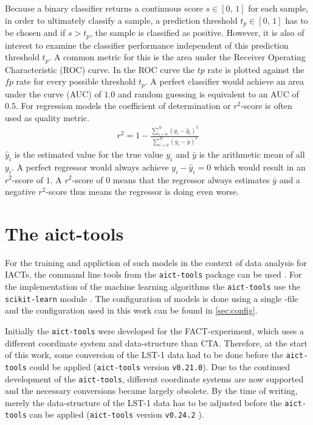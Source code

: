 Because a binary classifier returns a continuous score $s \in [0,\, 1]$ for each sample, in order to ultimately classify a sample,
a prediction threshold $t_p \in [0,\, 1]$ has to be chosen and if $s > t_p$, the sample is classified as positive. 
However, it is also of interest to examine the classifier performance independent of this prediction threshold $t_p$.
A common metric for this is the area under the Receiver Operating Characteristic (ROC) curve.
In the ROC curve the $tp$ rate is plotted against the $fp$ rate for every possible threshold $t_p$.
A perfect classifier would achieve an area under the curve (AUC) of $\num{1.0}$ and random guessing is equivalent to an AUC of $\num{0.5}$.
For regression models the coefficient of determination or $r^2$-score is often used as quality metric.
\begin{align}
    r^2 = 1 - \frac{\sum_{i = 0}^N (y_i - \hat{y}_i)^2}{\sum_{i = 0}^N (y_i - \bar{y})^2}
\end{align}
$\hat{y}_i$ is the estimated value for the true value $y_i$ and $\bar{y}$ is the arithmetic mean of all $y_i$.
A perfect regressor would always achieve $y_i - \hat{y}_i = 0$ which would result in an $r^2$-score of $\num{1}$.
A $r^2$-score of $\num{0}$ means that the regressor always estimates $\bar{y}$ and a negative $r^2$-score thus means the regressor is doing even worse.


\section{The aict-tools}
For the training and appliction of such models in the context of data analysis for IACTs, the command line tools from the \texttt{aict-tools} package can be used \cite{aict-tools}. 
For the implementation of the machine learning algorithms the \texttt{aict-tools} use the \texttt{scikit-learn} module \cite{scikit-learn}.
The configuration of models is done using a single -file and the configuration used in this work can be found in \autoref{sec:config}.

Initially the \texttt{aict-tools} were developed for the FACT-experiment, which uses a different coordinate system and data-structure than CTA.
Therefore, at the start of this work, some conversion of the LST-1 data had to be done before the \texttt{aict-tools} could be applied 
(\texttt{aict-tools} version \texttt{v0.21.0}).
Due to the continued development of the \texttt{aict-tools}, different coordinate systems are now supported and the necessary conversions became largely obsolete.
By the time of writing, merely the data-structure of the LST-1 data has to be adjusted before the \texttt{aict-tools} can be applied 
(\texttt{aict-tools} version \texttt{v0.24.2} \cite{aict-tools}).

